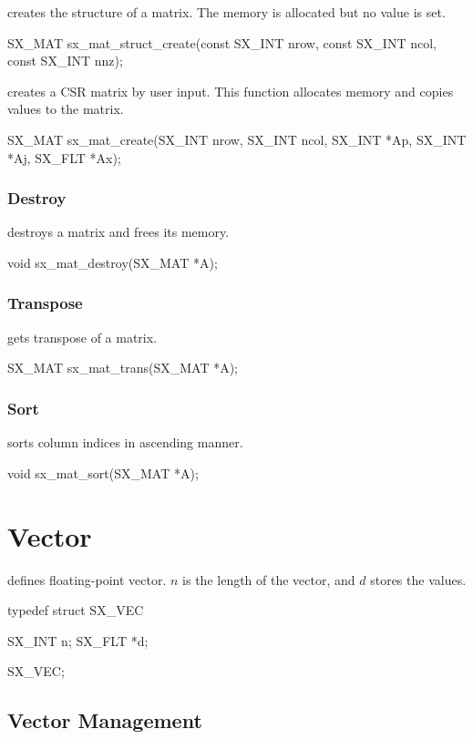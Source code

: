  creates the structure of a matrix. The memory is allocated
but no value is set.
\begin{evb}
SX_MAT sx_mat_struct_create(const SX_INT nrow, const SX_INT ncol, const SX_INT nnz);
\end{evb}

 creates a CSR matrix by user input. This function allocates memory
and copies values to the matrix.
\begin{evb}
SX_MAT sx_mat_create(SX_INT nrow, SX_INT ncol, SX_INT *Ap, SX_INT *Aj, SX_FLT *Ax);
\end{evb}

\subsubsection{Destroy}
 destroys a matrix and frees its memory.
\begin{evb}
void sx_mat_destroy(SX_MAT *A);
\end{evb}

\subsubsection{Transpose}
 gets transpose of a matrix.
\begin{evb}
SX_MAT sx_mat_trans(SX_MAT *A);
\end{evb}

\subsubsection{Sort}
 sorts column indices in ascending manner.
\begin{evb}
void sx_mat_sort(SX_MAT *A);
\end{evb}

\section{Vector}

 defines floating-point vector. {\color{blue} $n$} is the length of the vector, and 
{\color{blue} $d$} stores the values.
\begin{evb}
typedef struct SX_VEC 
{
    SX_INT   n;
    SX_FLT *d;

} SX_VEC;
\end{evb}

\subsection{Vector Management}

